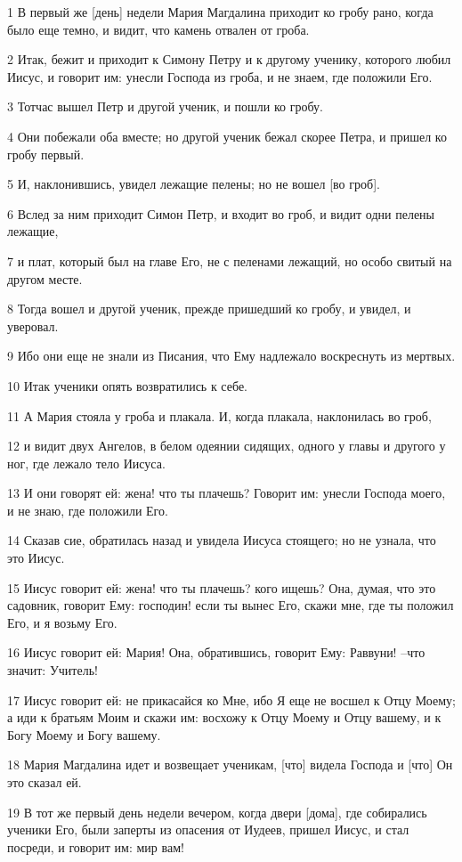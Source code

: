 \par 1 В первый же [день] недели Мария Магдалина приходит ко гробу рано, когда было еще темно, и видит, что камень отвален от гроба.
\par 2 Итак, бежит и приходит к Симону Петру и к другому ученику, которого любил Иисус, и говорит им: унесли Господа из гроба, и не знаем, где положили Его.
\par 3 Тотчас вышел Петр и другой ученик, и пошли ко гробу.
\par 4 Они побежали оба вместе; но другой ученик бежал скорее Петра, и пришел ко гробу первый.
\par 5 И, наклонившись, увидел лежащие пелены; но не вошел [во гроб].
\par 6 Вслед за ним приходит Симон Петр, и входит во гроб, и видит одни пелены лежащие,
\par 7 и плат, который был на главе Его, не с пеленами лежащий, но особо свитый на другом месте.
\par 8 Тогда вошел и другой ученик, прежде пришедший ко гробу, и увидел, и уверовал.
\par 9 Ибо они еще не знали из Писания, что Ему надлежало воскреснуть из мертвых.
\par 10 Итак ученики опять возвратились к себе.
\par 11 А Мария стояла у гроба и плакала. И, когда плакала, наклонилась во гроб,
\par 12 и видит двух Ангелов, в белом одеянии сидящих, одного у главы и другого у ног, где лежало тело Иисуса.
\par 13 И они говорят ей: жена! что ты плачешь? Говорит им: унесли Господа моего, и не знаю, где положили Его.
\par 14 Сказав сие, обратилась назад и увидела Иисуса стоящего; но не узнала, что это Иисус.
\par 15 Иисус говорит ей: жена! что ты плачешь? кого ищешь? Она, думая, что это садовник, говорит Ему: господин! если ты вынес Его, скажи мне, где ты положил Его, и я возьму Его.
\par 16 Иисус говорит ей: Мария! Она, обратившись, говорит Ему: Раввуни! --что значит: Учитель!
\par 17 Иисус говорит ей: не прикасайся ко Мне, ибо Я еще не восшел к Отцу Моему; а иди к братьям Моим и скажи им: восхожу к Отцу Моему и Отцу вашему, и к Богу Моему и Богу вашему.
\par 18 Мария Магдалина идет и возвещает ученикам, [что] видела Господа и [что] Он это сказал ей.
\par 19 В тот же первый день недели вечером, когда двери [дома], где собирались ученики Его, были заперты из опасения от Иудеев, пришел Иисус, и стал посреди, и говорит им: мир вам!

